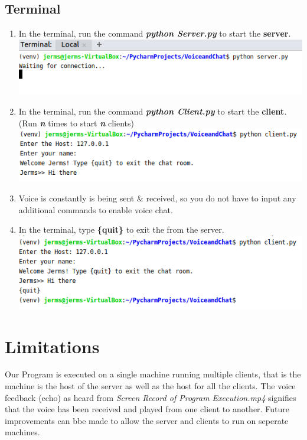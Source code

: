 \documentclass[a4paper,11pt]{article}
\begin{document}
\subsection{Terminal}
\begin{enumerate}
  \item In the terminal, run the command \textbf{\textit{python Server.py}} to start the \textbf{server}.
  \newline
  \includegraphics{server}
  \item In the terminal, run the command \textbf{\textit{python Client.py}} to start the \textbf{client}. (Run \textit{\textbf{n}} times to start \textit{\textbf{n}} clients)
  \newline
  \includegraphics{client}
   \item Voice is constantly is being sent \& received, so you do not have to input any additional commands to enable voice chat. 
   \item In the terminal, type \textbf{\{quit\}} to exit the from the server.
   \newline
   \includegraphics{exit}
\end{enumerate}

\section{Limitations}
Our Program is executed on a single machine running multiple clients, that is the machine is the host of the server as well as the host for all the clients. The voice feedback (echo) as heard from \textit{Screen Record of Program Execution.mp4} signifies that the voice has been received and played from one client to another. Future improvements can bbe made to allow the server and clients to run on seperate machines.
\end{document}
